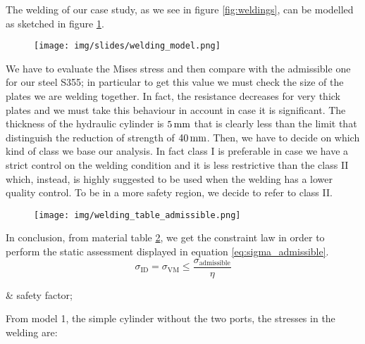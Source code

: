 \documentclass[a4paper,12pt]{article}
\begin{document}
The welding of our case study, as we see in figure \ref{fig:weldings}, can be modelled as sketched in figure \ref{fig:welding_model}. 
\begin{figure}[H]
\centering
\texttt{[image: img/slides/welding\_model.png]}
\caption{}
\label{fig:welding_model}
\end{figure}
We have to evaluate the Mises stress and then compare with the admissible one for our steel S355; in particular to get this value we must check the size of the plates we are welding together. In fact, the resistance decreases for very thick plates and we must take this behaviour in account in case it is significant.
The thickness of the hydraulic cylinder is $5\,\text{mm}$ that is clearly less than the limit that distinguish the reduction of strength of $40\,\text{mm}$. 
Then, we have to decide on which kind of class we base our analysis. In fact class I is preferable in case we have a strict control on the welding condition and it is less restrictive than the class II which, instead, is highly suggested to be used when the welding has a lower quality control. 
To be in a more safety region, we decide to refer to class II.
\begin{figure}[H]
\centering
\texttt{[image: img/welding\_table\_admissible.png]}
\caption{}
\label{fig:table_adm}
\end{figure}
In conclusion, from material table \ref{fig:table_adm}, we get the constraint law in order to perform the static assessment displayed in equation \ref{eq:sigma_admissible}.
\begin{equation}
\sigma_\text{ID} = \sigma_\text{VM} \leq \frac{\sigma_\text{admissible}}{\eta}
\label{eq:sigma_admissible}
\end{equation}
\begin{conditions}
\eta & safety factor;\\[0.5em]
\end{conditions}

From model 1, the simple cylinder without the two ports, the stresses in the welding are:
\end{document}
